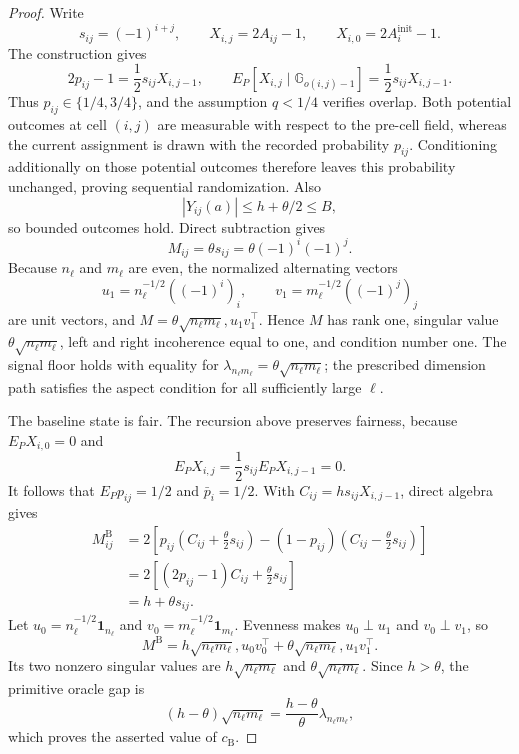 \documentclass{article}
\begin{document}
\begin{proof}
Write
\[
 s_{ij}=(-1)^{i+j},\qquad X_{i,j}=2A_{ij}-1,
 \qquad X_{i,0}=2A_i^{\mathrm{init}}-1.
\]
The construction gives
\[
 2p_{ij}-1=\frac12s_{ij}X_{i,j-1},
 \qquad
 E_P[X_{i,j}\mid\mathbb G_{o(i,j)-1}]
 =\frac12s_{ij}X_{i,j-1}.
\]
Thus \(p_{ij}\in\{1/4,3/4\}\), and the assumption \(q<1/4\) verifies overlap.  Both potential outcomes at cell \((i,j)\) are measurable with respect to the pre-cell field, whereas the current assignment is drawn with the recorded probability \(p_{ij}\).  Conditioning additionally on those potential outcomes therefore leaves this probability unchanged, proving sequential randomization.  Also
\[
 |Y_{ij}(a)|\le h+\theta/2\le B,
\]
so bounded outcomes hold.  Direct subtraction gives
\[
 M_{ij}=\theta s_{ij}=\theta(-1)^i(-1)^j.
\]
Because \(n_\ell\) and \(m_\ell\) are even, the normalized alternating vectors
\[
 u_1=n_\ell^{-1/2}((-1)^i)_i,
 \qquad
 v_1=m_\ell^{-1/2}((-1)^j)_j
\]
are unit vectors, and \(M=\theta\sqrt{n_\ell m_\ell},u_1v_1^\top\).  Hence \(M\) has rank one, singular value \(\theta\sqrt{n_\ell m_\ell}\), left and right incoherence equal to one, and condition number one.  The signal floor holds with equality for \(\lambda_{n_\ell m_\ell}=\theta\sqrt{n_\ell m_\ell}\); the prescribed dimension path satisfies the aspect condition for all sufficiently large \(\ell\).

The baseline state is fair.  The recursion above preserves fairness, because \(E_PX_{i,0}=0\) and
\[
 E_PX_{i,j}=\frac12s_{ij}E_PX_{i,j-1}=0.
\]
It follows that \(E_Pp_{ij}=1/2\) and \(\bar p_i=1/2\).  With \(C_{ij}=hs_{ij}X_{i,j-1}\), direct algebra gives
\[
 \begin{aligned}
 M^{\mathrm B}_{ij}
 &=2\left[p_{ij}\left(C_{ij}+\frac\theta2s_{ij}\right)
 -(1-p_{ij})\left(C_{ij}-\frac\theta2s_{ij}\right)\right]\\
 &=2\left[(2p_{ij}-1)C_{ij}+\frac\theta2s_{ij}\right]\\
 &=h+\theta s_{ij}.
 \end{aligned}
\]
Let \(u_0=n_\ell^{-1/2}\mathbf1_{n_\ell}\) and \(v_0=m_\ell^{-1/2}\mathbf1_{m_\ell}\).  Evenness makes \(u_0\perp u_1\) and \(v_0\perp v_1\), so
\[
 M^{\mathrm B}=h\sqrt{n_\ell m_\ell},u_0v_0^\top
 +\theta\sqrt{n_\ell m_\ell},u_1v_1^\top.
\]
Its two nonzero singular values are \(h\sqrt{n_\ell m_\ell}\) and \(\theta\sqrt{n_\ell m_\ell}\).  Since \(h>\theta\), the primitive oracle gap is
\[
 (h-\theta)\sqrt{n_\ell m_\ell}
 =\frac{h-\theta}{\theta}\lambda_{n_\ell m_\ell},
\]
which proves the asserted value of \(c_{\mathrm B}\).


\end{proof}
\end{document}
